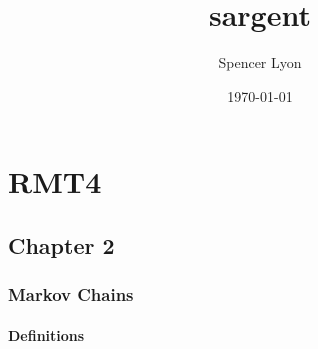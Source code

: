 \documentclass[11pt]{article}
\title{sargent}
\author{Spencer Lyon}
\date{\today}
\begin{document}
\maketitle

\setcounter{tocdepth}{4}
\tableofcontents
\vspace*{1cm}

\section{RMT4}
\label{sec-1}
\subsection{Chapter 2}
\label{sec-1-1}
\subsubsection{Markov Chains}
\label{sec-1-1-1}
\paragraph{Definitions}
\label{sec-1-1-1-1}
\end{document}
